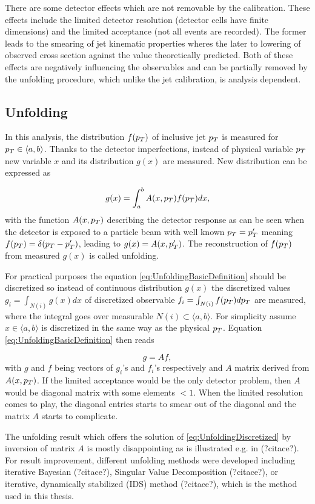 There are some detector effects which are not removable by the calibration. These
effects include the limited detector resolution (detector cells have finite
dimensions) and the limited acceptance (not all events are recorded). The former
leads to the smearing of jet kinematic properties wheres the later to
lowering of observed cross section against the value theoretically
predicted. Both of these effects are negatively influencing the observables
and can be partially removed by the unfolding procedure, which unlike
the jet calibration, is analysis dependent. 

\subsection{Unfolding}

In this analysis, the distribution $f(p_{T})$ of inclusive jet $p_{T}$ is measured
for $p_{T} \in \langle a, b \rangle$. Thanks to the detector imperfections,
instead of physical variable $p_{T}$ new variable $x$ and its distribution
$g(x)$ are measured. New distribution can be expressed as

\begin{equation}
  g(x) = \int_a^b A(x, p_{T}) f(p_{T}) dx,
  \label{eq:UnfoldingBasicDefinition}
\end{equation}
with the function $A(x, p_{T})$ describing the detector response as can be seen
when the detector is exposed to a particle beam with well known $p_{T} = p_{T}'$
meaning $f(p_{T}) = \delta(p_{T} - p_{T}')$, leading to $g(x) = A(x, p_{T}')$. The
reconstruction of $f(p_{T})$ from measured $g(x)$ is called unfolding.

For practical purposes the equation \eqref{eq:UnfoldingBasicDefinition} should
be discretized so instead of continuous distribution $g(x)$ the discretized
values $g_i = \int_{N(i)} g(x)dx$ of discretized observable $f_i =
\int_{N(i)} f(p_{T})dp_{T}$ are measured, where the integral goes over measurable $N(i)
\subset \langle a, b \rangle$. For simplicity assume $x \in \langle
a, b \rangle$ is discretized in the same way as the physical $p_{T}$. Equation 
\eqref{eq:UnfoldingBasicDefinition} then reads

\begin{equation}
  g = Af,
  \label{eq:UnfoldingDiscretized}
\end{equation}
with $g$ and $f$ being vectors of $g_i$'s and $f_i$'s respectively and $A$ matrix
derived from $A(x, p_{T})$. If the limited acceptance would be the only detector
problem, then $A$ would be diagonal matrix with some elements $ < 1$. When the
limited resolution comes to play, the diagonal entries starts to smear out of
the diagonal and the matrix $A$ starts to complicate.

The unfolding result which offers the solution of
\eqref{eq:UnfoldingDiscretized} by inversion of matrix $A$ is mostly
disappointing as is illustrated e.g. in (?citace?). For result improvement,
different unfolding methods were developed including iterative Bayesian
(?citace?), Singular Value Decomposition (?citace?), or iterative, dynamically
stabilized (IDS) method (?citace?), which is the method used in this thesis. 


